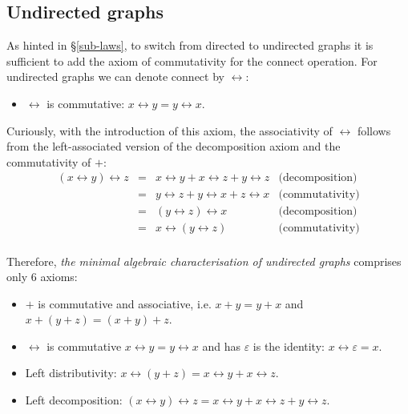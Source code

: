 \subsection{Undirected graphs}\label{sub-undirected}

As hinted in \S\ref{sub-laws}, to switch from directed to undirected graphs it
is sufficient to add the axiom of commutativity for the connect operation. For
undirected graphs we can denote connect by $\leftrightarrow$:

\begin{itemize}
    \item $\leftrightarrow$ is commutative: $x \leftrightarrow y = y \leftrightarrow x$.
\end{itemize}

Curiously, with the introduction of this axiom, the associativity of $\leftrightarrow$
follows from the left-associated version of the decomposition axiom and the
commutativity of $+$:
\[
\begin{array}{rcll}
(x \leftrightarrow y) \leftrightarrow z & = & x \leftrightarrow y + x \leftrightarrow z + y \leftrightarrow z & \text{(decomposition)}\\
 & = & y \leftrightarrow z + y \leftrightarrow x + z \leftrightarrow x & \text{(commutativity)}\\
 & = &  (y \leftrightarrow z) \leftrightarrow x & \text{(decomposition)}\\
 & = &   x \leftrightarrow (y \leftrightarrow z) & \text{(commutativity)}\\
\end{array}
\]

Therefore, \emph{the minimal algebraic characterisation of undirected graphs}
comprises only 6 axioms:

\begin{itemize}
    \item $+$ is commutative and associative, i.e. $x + y = y + x$ and
    $x + (y + z) = (x + y) + z$.
    \item $\leftrightarrow$ is commutative $x \leftrightarrow y = y \leftrightarrow x$ and
    has $\varepsilon$ is the identity: $x \leftrightarrow \varepsilon = x$.
    \item Left distributivity:
    $x \leftrightarrow (y + z) = x \leftrightarrow y + x \leftrightarrow z$.
    \item Left decomposition: $(x \leftrightarrow y) \leftrightarrow z =
    x \leftrightarrow y + x \leftrightarrow z + y \leftrightarrow z$.
\end{itemize}

